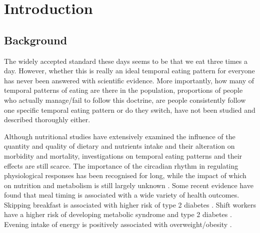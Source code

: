 
\chapter{Introduction} %

\label{Chapter 1} %


\newcommand{\keyword}[1]{\textbf{#1}}
\newcommand{\tabhead}[1]{\textbf{#1}}
\newcommand{\code}[1]{\texttt{#1}}
\newcommand{\file}[1]{\texttt{\bfseries#1}}
\newcommand{\option}[1]{\texttt{\itshape#1}}


\section{Background}\vspace{-0.3cm}

The widely accepted standard these days seems to be that we eat three times a day. However, whether this is really an ideal temporal eating pattern for everyone has never been answered with scientific evidence. More importantly, how many of temporal patterns of eating are there in the population, proportions of people who actually manage/fail to follow this doctrine, are people consistently follow one specific temporal eating pattern or do they switch, have not been studied and described thoroughly either. 

Although nutritional studies have extensively examined the influence of the quantity and quality of dietary and nutrients intake and their alteration on morbidity and mortality, investigations on temporal eating patterns and their effects are still scarce. The importance of the circadian rhythm in regulating physiological responses has been recognised for long, while the impact of which on nutrition and metabolism is still largely unknown \parencite{johnston2014physiological, garaulet2014timing, asher2015time}. Some recent evidence have found that meal timing is associated with a wide variety of health outcomes. Skipping breakfast is associated with higher risk of type 2 diabetes \parencite{uemura2015breakfast}. Shift workers have a higher risk of developing metabolic syndrome \parencite{de2009rotating} and type 2 diabetes \parencite{pan2011rotating}. Evening intake of energy is positively associated with overweight/obesity \parencite{almoosawi2016chrono}. 

